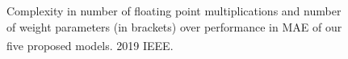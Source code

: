 
\begin{figure}[t]
  \centering
    \begin{adjustbox}{width=0.7\columnwidth}
      
    \end{adjustbox}
    \caption{Complexity in number of floating point multiplications and number of weight parameters (in brackets) over performance in MAE of our five proposed models. \textsuperscript{\textregistered}2019 IEEE.}%
  \label{fig:complexity}
\end{figure}

